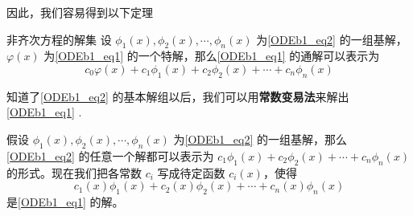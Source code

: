 因此，我们容易得到以下定理
\begin{theorem}{非齐次方程的解集}
设 $\phi_1(x), \phi_2(x), \cdots, \phi_n(x)$ 为\autoref{ODEb1_eq2} 的一组基解，$\varphi(x)$ 为\autoref{ODEb1_eq1} 的一个特解，那么\autoref{ODEb1_eq1} 的通解可以表示为
\begin{equation}
c_0\varphi(x)+c_1\phi_1(x)+c_2\phi_2(x)+\cdots+c_n\phi_n(x)
\end{equation}
\end{theorem}

知道了\autoref{ODEb1_eq2} 的基本解组以后，我们可以用\textbf{常数变易法}来解出\autoref{ODEb1_eq1} .

假设 $\phi_1(x), \phi_2(x), \cdots, \phi_n(x)$ 为\autoref{ODEb1_eq2} 的一组基解，那么\autoref{ODEb1_eq2} 的任意一个解都可以表示为 $c_1\phi_1(x)+c_2\phi_2(x)+\cdots+c_n\phi_n(x)$ 的形式。现在我们把各常数 $c_i$ 写成待定函数 $c_i(x)$，使得
\begin{equation}
c_1(x)\phi_1(x)+c_2(x)\phi_2(x)+\cdots+c_n(x)\phi_n(x)
\end{equation}
是\autoref{ODEb1_eq1} 的解。

